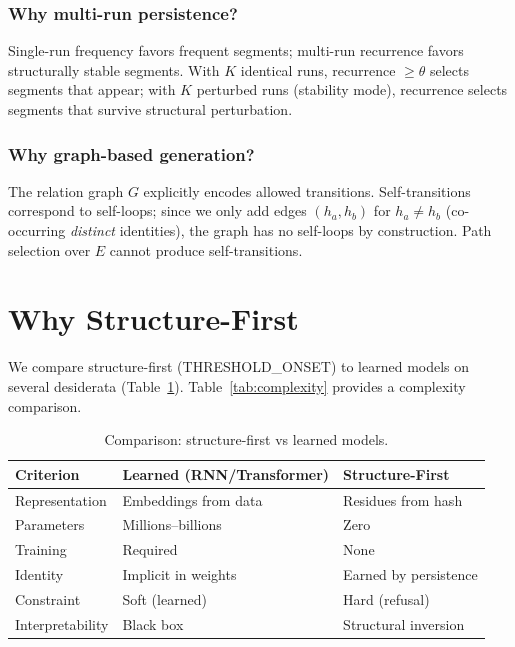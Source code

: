\documentclass[10pt]{article}
\begin{document}
\subsubsection{Why multi-run persistence?} Single-run frequency favors frequent segments; multi-run recurrence favors structurally stable segments. With $K$ identical runs, recurrence $\geq \theta$ selects segments that appear; with $K$ perturbed runs (stability mode), recurrence selects segments that survive structural perturbation.

\subsubsection{Why graph-based generation?} The relation graph $G$ explicitly encodes allowed transitions. Self-transitions correspond to self-loops; since we only add edges $(h_a, h_b)$ for $h_a \neq h_b$ (co-occurring \emph{distinct} identities), the graph has no self-loops by construction. Path selection over $E$ cannot produce self-transitions.

\section{Why Structure-First}
\label{sec:why}

We compare structure-first (THRESHOLD\_ONSET) to learned models on several desiderata (Table~\ref{tab:compare}). Table~\ref{tab:complexity} provides a complexity comparison.

\begin{table}[t]
\centering
\caption{Comparison: structure-first vs learned models.}
\label{tab:compare}
\begin{tabular}{lll}
\toprule
\textbf{Criterion} & \textbf{Learned (RNN/Transformer)} & \textbf{Structure-First} \\
\midrule
Representation & Embeddings from data & Residues from hash \\
Parameters & Millions--billions & Zero \\
Training & Required & None \\
Identity & Implicit in weights & Earned by persistence \\
Constraint & Soft (learned) & Hard (refusal) \\
Interpretability & Black box & Structural inversion \\
\bottomrule
\end{tabular}
\end{table}
\end{document}
